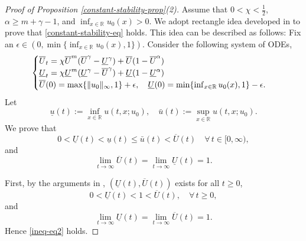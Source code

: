 \documentclass[11pt]{article} %
\theoremstyle{remark}
\theoremstyle{remark}
\numberwithin{equation}{section}
\numberwithin{figure}{section}
\numberwithin{table}{section}
\newcommand\RR{\ensuremath{\mathbb{R}}}
\begin{document}
\begin{proof}[Proof of Proposition \ref{constant-stability-prop}(2)]
Assume that  $0<\chi<\frac{1}{2}$,  $\alpha\ge m+\gamma-1$, and  $\inf_{x\in\mathbb{R}}u_0(x)>0$.
We adopt rectangle idea developed in \cite{GaSaTe}
to prove that  \eqref{constant-stability-eq} holds.
This idea can be described  as follows: Fix an $\epsilon\in (0,\min\{\inf_{x\in\RR} u_0(x),1\})$. 
 Consider the following system of ODEs,
$$
\begin{cases}
\overline U_t=\chi \overline U^m (\overline U^\gamma -\underline U^\gamma)+ \overline U(1-\overline U^\alpha)\cr
\underline U_t=\chi \underline U^m (\underline U^\gamma-\overline U^\gamma)+\underline U(1-\underline U^\alpha)\cr
\overline U(0)=\max\{\|u_0\|_\infty, 1\}+\epsilon,\quad \underline U(0)=\min\{\inf_{x\in\RR}u_0(x),1\}-\epsilon.
\end{cases}
$$
Let
$$
\underline u(t):=\inf_{x\in\mathbb{R} }u(t,x;u_0),\quad \bar u(t):=\sup_{x\in\mathbb{R} }u(t,x;u_0).
$$
We prove that
\begin{equation}
\label{ineq-eq1}
0<\underline U(t)<\underline u(t)\le \bar u(t)<  \overline U(t)\quad \forall\, t\in [0,\infty),
\end{equation}
and
\begin{equation}
\label{ineq-eq2}
\lim_{t\to\infty} \overline U(t)=\lim_{t\to\infty}\underline U(t)=1.
\end{equation}

First, by the arguments in \cite[Lemmas 3.1, 3.2]{GaSaTe}, $(\underline U(t),\overline U(t))$ exists for all $t\ge 0$,
$$
0<\underline U(t)<1<\overline U(t),\quad \forall\, t\ge 0,
$$
and
$$
\lim_{t\to\infty}\underline U(t)=\lim_{t\to\infty }\overline U(t)=1.
$$
Hence \eqref{ineq-eq2} holds.


\end{proof}
\end{document}
